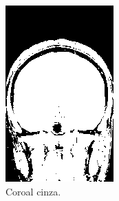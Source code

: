 \documentclass{article}
\begin{document}
\begin{figure}[h]
\begin{subfigure}[b]{0.3\textwidth}
        \includegraphics[width=\textwidth]{brain/neuroradiologist-coronal-gray.png}
        \caption{Coroal cinza.}
    \end{subfigure}
    ~
    \begin{subfigure}[b]{0.3\textwidth}

\end{subfigure}
\end{figure}
\end{document}
